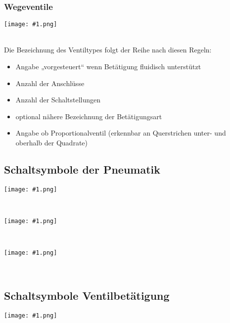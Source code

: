 \documentclass[landscape,a4paper,10pt]{article}
\newcommand{\graphiccol}[1]{
\noindent
\begin{minipage}{\columnwidth}
\centering
\texttt{[image: \#1.png]}
\end{minipage}
\medskip \\
}
\begin{document}
\begin{multicols*}{3}
\subsubsection{Wegeventile}
\graphiccol{Schaltsymbole_Hydraulik_6_Wegeventile}
Die Bezeichnung des Ventiltypes folgt der Reihe nach diesen Regeln:
\begin{itemize}
\item  Angabe „vorgesteuert“ wenn Betätigung fluidisch unterstützt
\item Anzahl der Anschlüsse
\item Anzahl der Schaltstellungen
\item optional nähere Bezeichnung der Betätigungsart 
\item Angabe ob Proportionalventil (erkennbar an Querstrichen unter- und oberhalb der Quadrate)
\end{itemize}
\subsection{Schaltsymbole der Pneumatik}
\graphiccol{Schaltsymbole_Pneumatik_1}
\graphiccol{Schaltsymbole_Pneumatik_2}
\graphiccol{Schaltsymbole_Pneumatik_3}

\subsection{Schaltsymbole Ventilbetätigung}
\graphiccol{Schaltsymbole_Ventilbetaetigung}



\end{multicols*}
\end{document}
